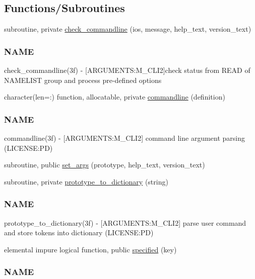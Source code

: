 \subsection*{Functions/\+Subroutines}
\begin{DoxyCompactItemize}
\item 
subroutine, private \mbox{\hyperlink{namespacem__cli2_a02d4639b325d1b8c6fd3b03ba515f2b3}{check\+\_\+commandline}} (ios, message, help\+\_\+text, version\+\_\+text)
\begin{DoxyCompactList}\small\item\em \subsubsection*{N\+A\+ME}

check\+\_\+commandline(3f) -\/ \mbox{[}A\+R\+G\+U\+M\+E\+N\+TS\+:M\+\_\+\+C\+L\+I2\mbox{]}check status from R\+E\+AD of N\+A\+M\+E\+L\+I\+ST group and process pre-\/defined options \end{DoxyCompactList}\item 
character(len=\+:) function, allocatable, private \mbox{\hyperlink{namespacem__cli2_a85c38a938a7dd9a749daf8effe45c109}{commandline}} (definition)
\begin{DoxyCompactList}\small\item\em \subsubsection*{N\+A\+ME}

commandline(3f) -\/ \mbox{[}A\+R\+G\+U\+M\+E\+N\+TS\+:M\+\_\+\+C\+L\+I2\mbox{]} command line argument parsing (L\+I\+C\+E\+N\+SE\+:PD) \end{DoxyCompactList}\item 
subroutine, public \mbox{\hyperlink{namespacem__cli2_a6d20994aa80217dd3d0ffd1d5586f736}{set\+\_\+args}} (prototype, help\+\_\+text, version\+\_\+text)
\item 
subroutine, private \mbox{\hyperlink{namespacem__cli2_a14896d00e509cbc32f4df993a8d6f75b}{prototype\+\_\+to\+\_\+dictionary}} (string)
\begin{DoxyCompactList}\small\item\em \subsubsection*{N\+A\+ME}

prototype\+\_\+to\+\_\+dictionary(3f) -\/ \mbox{[}A\+R\+G\+U\+M\+E\+N\+TS\+:M\+\_\+\+C\+L\+I2\mbox{]} parse user command and store tokens into dictionary (L\+I\+C\+E\+N\+SE\+:PD) \end{DoxyCompactList}\item 
elemental impure logical function, public \mbox{\hyperlink{namespacem__cli2_a90118f308a5120041a5862fca4740367}{specified}} (key)
\begin{DoxyCompactList}\small\item\em \subsubsection*{N\+A\+ME}


\end{DoxyCompactList}
\end{DoxyCompactItemize}
